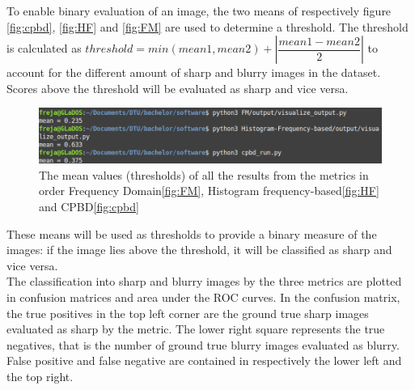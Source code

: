 To enable binary evaluation of an image, the two means of respectively figure \ref{fig:cpbd}, \ref{fig:HF} and \ref{fig:FM} are used to determine a threshold. The threshold is calculated as $threshold=min(mean1, mean2) + |\dfrac{mean1-mean2}{2}|$ to account for the different amount of sharp and blurry images in the dataset. Scores above the threshold will be evaluated as sharp and vice versa.

\begin{figure}[H]
    \centering
    \includegraphics[width=\textwidth]{Figures/BlurredImages/means.png}
    \caption{The mean values (thresholds) of all the results from the metrics in order Frequency Domain\ref{fig:FM}, Histogram frequency-based\ref{fig:HF} and CPBD\ref{fig:cpbd}}
    \label{fig:means}
\end{figure}
These means will be used as thresholds to provide a binary measure of the images: if the image lies above the threshold, it will be classified as sharp and vice versa.\\

The classification into sharp and blurry images by the three metrics are plotted in confusion matrices and area under the ROC curves. In the confusion matrix, the true positives in the top left corner are the ground true sharp images evaluated as sharp by the metric. The lower right square represents the true negatives, that is the number of ground true blurry images evaluated as blurry. False positive and false negative are contained in respectively the lower left and the top right.\\ %

